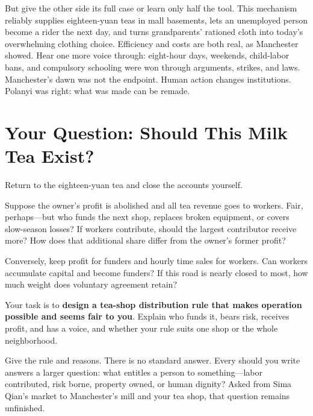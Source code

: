 But give the other side its full case or learn only half the tool. This mechanism reliably supplies eighteen-yuan teas in mall basements, lets an unemployed person become a rider the next day, and turns grandparents' rationed cloth into today's overwhelming clothing choice. Efficiency and costs are both real, as Manchester showed. Hear one more voice through: eight-hour days, weekends, child-labor bans, and compulsory schooling were won through arguments, strikes, and laws. Manchester's dawn was not the endpoint. Human action changes institutions. Polanyi was right: what was made can be remade.

\section{Your Question: Should This Milk Tea Exist?}
Return to the eighteen-yuan tea and close the accounts yourself.

Suppose the owner's profit is abolished and all tea revenue goes to workers. Fair, perhaps---but who funds the next shop, replaces broken equipment, or covers slow-season losses? If workers contribute, should the largest contributor receive more? How does that additional share differ from the owner's former profit?

Conversely, keep profit for funders and hourly time sales for workers. Can workers accumulate capital and become funders? If this road is nearly closed to most, how much weight does voluntary agreement retain?

Your task is to \textbf{design a tea-shop distribution rule that makes operation possible and seems fair to you}. Explain who funds it, bears risk, receives profit, and has a voice, and whether your rule suits one shop or the whole neighborhood.

Give the rule and reasons. There is no standard answer. Every should you write answers a larger question: what entitles a person to something---labor contributed, risk borne, property owned, or human dignity? Asked from Sima Qian's market to Manchester's mill and your tea shop, that question remains unfinished.
